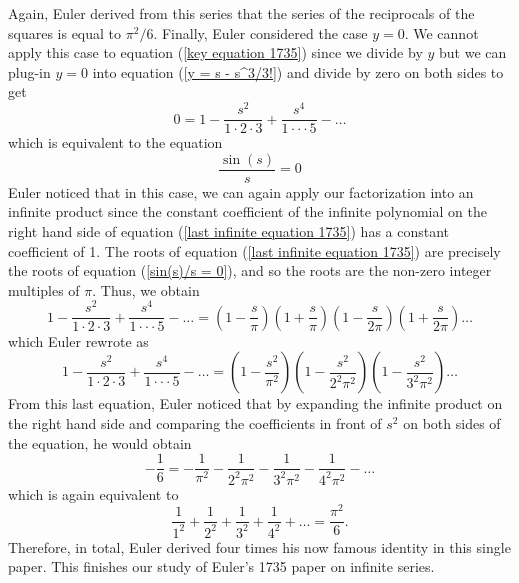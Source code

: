 Again, Euler derived from this series that the series of the reciprocals of the squares is equal to $\pi^2/6$. Finally, Euler considered the case $y = 0$. We cannot apply this case to equation (\ref{key equation 1735}) since we divide by $y$ but we can plug-in $y = 0$ into equation (\ref{y = s - s^3/3!}) and divide by zero on both sides to get 
\begin{equation} \label{last infinite equation 1735}
    0 = 1 - \frac{s^2}{1\cdot 2 \cdot 3} + \frac{s^4}{1\cdot \cdot \cdot 5} - \dots
\end{equation}
which is equivalent to the equation 
\begin{equation} \label{sin(s)/s = 0}
    \frac{\sin(s)}{s} = 0
\end{equation}
Euler noticed that in this case, we can again apply our factorization into an infinite product since the constant coefficient of the infinite polynomial on the right hand side of equation (\ref{last infinite equation 1735}) has a constant coefficient of 1. The roots of equation (\ref{last infinite equation 1735}) are precisely the roots of equation (\ref{sin(s)/s = 0}), and so the roots are the non-zero integer multiples of $\pi$. Thus, we obtain
$$1 - \frac{s^2}{1\cdot 2 \cdot 3} + \frac{s^4}{1\cdot \cdot \cdot 5} - \dots = \left(1 - \frac{s}{\pi}\right)\left(1 + \frac{s}{\pi}\right)\left(1 - \frac{s}{2\pi}\right)\left(1 + \frac{s}{2\pi}\right)\dots$$
which Euler rewrote as
\begin{equation}
    1 - \frac{s^2}{1\cdot 2 \cdot 3} + \frac{s^4}{1\cdot \cdot \cdot 5} - \dots = \left(1 - \frac{s^2}{\pi^2}\right)\left(1 - \frac{s^2}{2^2\pi^2}\right)\left(1 - \frac{s^2}{3^2\pi^2}\right)\dots
\end{equation}
From this last equation, Euler noticed that by expanding the infinite product on the right hand side and comparing the coefficients in front of $s^2$ on both sides of the equation, he would obtain
$$-\frac{1}{6} = -\frac{1}{\pi^2}-\frac{1}{2^2\pi^2}-\frac{1}{3^2\pi^2}-\frac{1}{4^2\pi^2}-\dots$$
which is again equivalent to
$$\frac{1}{1^2} + \frac{1}{2^2} + \frac{1}{3^2} + \frac{1}{4^2} + \dots = \frac{\pi^2}{6}.$$
Therefore, in total, Euler derived four times his now famous identity in this single paper. This finishes our study of Euler's 1735 paper on infinite series. 

